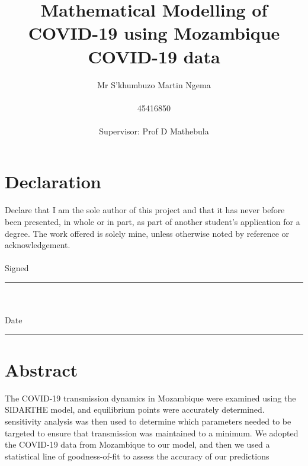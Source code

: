\documentclass{article}
\title{Mathematical Modelling of COVID-19 using Mozambique COVID-19 data}
\author{Mr S'khumbuzo Martin Ngema\\\\ 45416850\\\\Supervisor: Prof D Mathebula}
\begin{document}
\newpage
\maketitle
\newpage
{}
\fancyfoot[LE,RO]{\thepage}
\section*{Declaration}
Declare that I am the sole author of this project and that it has never before been presented, in whole or in part, as part of another student's application for a degree. The work offered is solely mine, unless otherwise noted by reference or acknowledgement.\\\\Signed \rule{\textwidth}{0.2pt}\\\\
Date \rule{\textwidth}{0.2pt}
\newpage
\section*{Abstract}
The COVID-19 transmission dynamics in Mozambique were examined using the SIDARTHE model, and equilibrium points were accurately determined. sensitivity analysis was then used to determine which parameters needed to be targeted to ensure that transmission was maintained to a minimum. We adopted the COVID-19 data from Mozambique to our model, and then we used a statistical line of goodness-of-fit to assess the accuracy of our predictions
\newpage
\end{document}
